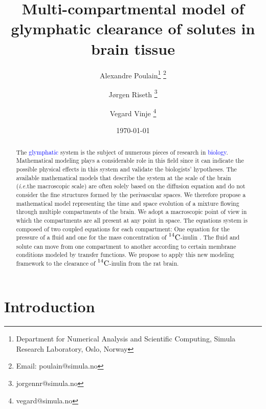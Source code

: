 \documentclass[10pt]{article}
\title{Multi-compartmental model of glymphatic clearance of solutes in brain tissue}
\author{Alexandre Poulain\thanks{Department for Numerical Analysis and Scientific Computing, Simula Research Laboratory, Oslo, Norway} 
\thanks{Email: poulain@simula.no} \and Jørgen Riseth \thanks{jorgennr@simula.no} \and Vegard Vinje \thanks{vegard@simula.no}}
\date{\today}
\newcommand{\VV}[1]{\textcolor{red}{VV: #1}}
\newcommand{\ie}{\emph{i.e.}\;}
\newcommand{\1}{^{(1)}}
\newcommand{\2}{^{(2)}}
\newcommand{\Cinulin}{$\prescript{14}{}{\text{C}}$-inulin }
\newcommand{\corr}[1]{\textcolor{blue}{#1}}
\begin{document}
\maketitle


\begin{abstract}
    The \corr{glymphatic} system is the subject of numerous pieces of research in \corr{biology}. Mathematical modeling plays a considerable role in this field since it can indicate the possible physical effects in this system and validate the biologists' hypotheses. The available mathematical models that describe the system at the scale of the brain (\ie the macroscopic scale) are often solely based on the diffusion equation and do not consider the fine structures formed by the perivascular spaces.   
 We therefore propose a mathematical model representing the time and space evolution of a mixture flowing through multiple compartments of the brain. We adopt a macroscopic point of view in which the compartments are all present at any point in space. The equations system is composed of two coupled equations for each compartment: One equation for the pressure of a fluid and one for the mass concentration of \Cinulin. The fluid and solute can move from one compartment to another according to certain membrane conditions modeled by transfer functions. We propose to apply this new modeling framework to the clearance of \Cinulin from the rat brain. 
\end{abstract}


\section{Introduction}

\end{document}
